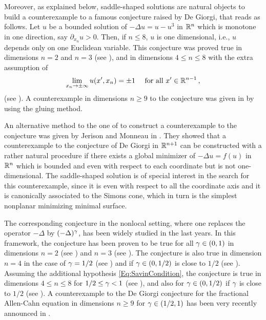 Moreover, as explained below, saddle-shaped solutions are natural objects to build a counterexample to a famous conjecture raised by De Giorgi, that reads as follows. Let $u$ be a bounded solution of $-\Delta  u = u - u^3$ in $\mathbb{R}^n$ which is monotone in one direction, say $\partial_{x_n} u > 0$. Then, if $n\leq 8$, $u$ is one dimensional, i.e., $u$ depends only on one Euclidean variable. This conjecture was proved true in dimensions $n=2$ and  $n=3$ (see \cite{GhoussoubGui,AmbrosioCabre}), and in dimensions $4\leq n \leq 8$ with the extra assumption of
\begin{equation}
\label{Eq:SavinCondition}
\lim_{x_n \to \pm \infty} u(x',x_n) = \pm 1 \quad \text{ for all } x'\in \mathbb{R}^{n-1}\,,
\end{equation}
(see \cite{Savin-DeGiorgi}). A counterexample in dimensions $n\geq 9$ to the conjecture was given in \cite{delPinoKowalczykWei} by using the gluing method. 

An alternative method to the one of \cite{delPinoKowalczykWei} to construct a counterexample to the conjecture was given by Jerison and Monneau in \cite{JerisonMonneau}. They showed that a counterexample to the conjecture of De Giorgi in $\mathbb{R}^{n+1}$ can be constructed with a rather natural procedure if there exists a global minimizer of $-\Delta u = f(u)$ in $\mathbb{R}^n$ which is bounded and even with respect to each coordinate but is not one-dimensional. The saddle-shaped solution is of special interest in the search for this counterexample, since it is even with respect to all the coordinate axis and it is canonically associated to the Simons cone, which in turn is the simplest nonplanar minimizing minimal surface.




The corresponding conjecture in the nonlocal setting, where one replaces the operator $-\Delta$ by $(-\Delta)^\gamma$, has been widely studied in the last years. In this framework, the conjecture has been proven to be true for all $\gamma\in(0,1)$ in dimensions $n=2$ (see \cite{CabreSolaMorales, CabreSireI,SireValdinoci,BucurValdinoci-DeGiorgi}) and $n=3$ (see \cite{CabreCinti-EnergyHalfL, CabreCinti-SharpEnergy,DipierroFarinaValdinoci}). The conjecture is also true in dimension $n=4$ in the case of $\gamma = 1/2$ (see \cite{FigalliSerra}) and if $\gamma\in(0,1/2)$ is close to $1/2$ (see \cite{CabreCintiSerra-Stable}). Assuming the additional hypothesis \eqref{Eq:SavinCondition}, the conjecture is true in dimensions $4\leq n \leq 8$ for $1/2 \leq \gamma < 1$ (see \cite{Savin-Fractional,Savin-Fractional2}), and also for $\gamma\in(0,1/2)$ if $\gamma$ is close to $1/2$ (see \cite{DipierroSerraValdinoci}). A counterexample to the De Giorgi conjecture for the fractional Allen-Cahn equation in dimensions $n \geq 9$ for $\gamma \in (1/2,1)$ has been very recently announced in \cite{ChanLiuWei}.

